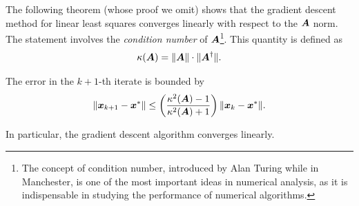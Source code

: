 The following theorem (whose proof we omit) shows that the gradient descent method for linear least squares converges linearly with respect to the $\bm{A}$ norm. The statement involves the {\em condition number} of $\bm{A}$\footnote{The concept of condition number, introduced by Alan Turing while in Manchester, is one of the most important ideas in numerical analysis, as it is indispensable in studying the performance of numerical algorithms.}. This quantity is defined as
\begin{equation*}
 \kappa(\bm{A}) = \Vert {\bm{A}}\Vert\cdot \Vert {\bm{A}^{\dagger}}\Vert.
\end{equation*}

\begin{theorem}
 The error in the $k+1$-th iterate is bounded by
 \begin{equation*}
  \Vert {\bm{x}_{k+1}-\bm{x}^*}\Vert \leq \left(\frac{\kappa^2(\bm{A})-1}{\kappa^2(\bm{A})+1}\right)\Vert {\bm{x}_{k}-\bm{x}^*}\Vert.
 \end{equation*}
\end{theorem}

In particular, the gradient descent algorithm converges linearly. 

